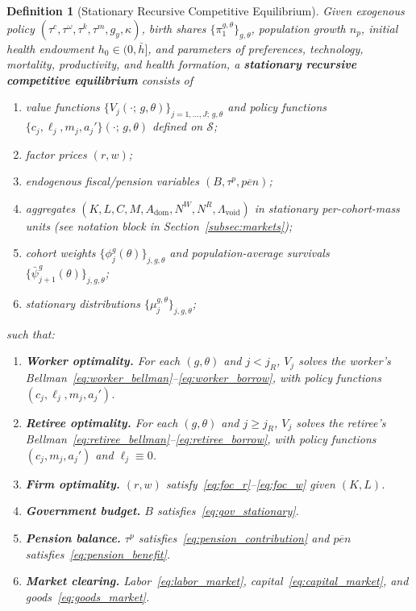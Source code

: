 \documentclass[12pt,a4paper]{article}
\newtheorem{definition}{Definition}
\begin{document}
\begin{definition}[Stationary Recursive Competitive Equilibrium]
\label{def:equilibrium}
Given exogenous policy $(\tau^c, \tau^\omega, \tau^k, \tau^m, g_y, \kappa)$, birth shares $\{\pi^{g,\theta}_1\}_{g,\theta}$, population growth $n_p$, initial health endowment $h_0 \in (0, \bar h]$, and parameters of preferences, technology, mortality, productivity, and health formation, a \textbf{stationary recursive competitive equilibrium} consists of
\begin{enumerate}
\item value functions $\{V_j(\cdot;\, g, \theta)\}_{j=1,\ldots,J;\, g,\theta}$ and policy functions $\{c_j, \ell_j, m_j, a_j'\}(\cdot;\, g, \theta)$ defined on $\mathcal{S}$;
\item factor prices $(r, w)$;
\item endogenous fiscal/pension variables $(B, \tau^p, \overline{pen})$;
\item aggregates $(K, L, C, M, A_{\mathrm{dom}}, N^W, N^R, \Lambda_{\mathrm{void}})$ in stationary per-cohort-mass units (see notation block in Section~\ref{subsec:markets});
\item cohort weights $\{\phi_j^{g}(\theta)\}_{j, g, \theta}$ and population-average survivals $\{\bar\psi_{j+1}^{g}(\theta)\}_{j, g, \theta}$;
\item stationary distributions $\{\mu_j^{g,\theta}\}_{j, g, \theta}$;
\end{enumerate}
such that:
\begin{enumerate}
\item \textbf{Worker optimality.} For each $(g, \theta)$ and $j < j_R$, $V_j$ solves the worker's Bellman~\eqref{eq:worker_bellman}--\eqref{eq:worker_borrow}, with policy functions $(c_j, \ell_j, m_j, a_j')$.
\item \textbf{Retiree optimality.} For each $(g, \theta)$ and $j \geq j_R$, $V_j$ solves the retiree's Bellman~\eqref{eq:retiree_bellman}--\eqref{eq:retiree_borrow}, with policy functions $(c_j, m_j, a_j')$ and $\ell_j \equiv 0$.
\item \textbf{Firm optimality.} $(r, w)$ satisfy~\eqref{eq:foc_r}--\eqref{eq:foc_w} given $(K, L)$.
\item \textbf{Government budget.} $B$ satisfies~\eqref{eq:gov_stationary}.
\item \textbf{Pension balance.} $\tau^p$ satisfies~\eqref{eq:pension_contribution} and $\overline{pen}$ satisfies~\eqref{eq:pension_benefit}.
\item \textbf{Market clearing.} Labor~\eqref{eq:labor_market}, capital~\eqref{eq:capital_market}, and goods~\eqref{eq:goods_market}.

\end{enumerate}
\end{definition}
\end{document}
